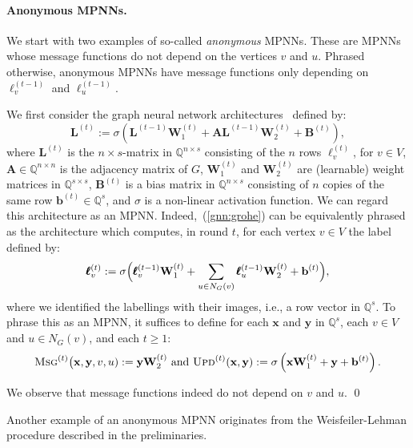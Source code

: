 \paragraph{Anonymous MPNNs.}
We start with two examples of so-called \textit{anonymous}  MPNNs. These are MPNNs whose message functions do not depend on the vertices $v$ and $u$. Phrased otherwise, anonymous MPNNs have message functions only depending on $\pmb{\ell}_v^{(t-1)}$ and $\pmb{\ell}_u^{(t-1)}$.


\begin{example}\label{ex:GNN}
We first consider
the graph neural network
architectures~\cite{hyl17,grohewl} defined by:
\begin{equation}
\mathbf{L}^{(t)}:=\sigma\left(\mathbf{L}^{(t-1)}\mathbf{W}_1^{(t)}+\mathbf{A}\mathbf{L}^{(t-1)}\mathbf{W}_2^{(t)}+\mathbf{B}^{(t)}\right), \label{gnn:grohe}
\end{equation}
where $\mathbf{L}^{(t)}$ is the $n\times s$-matrix in $\mathbb{Q}^{n\times s}$ consisting of the $n$ rows $\pmb{\ell}^{(t)}_v$, for $v\in V$, $\mathbf{A}\in\mathbb{Q}^{n\times n}$ is the adjacency matrix of $G$, $\mathbf{W}_1^{(t)}$ and $\mathbf{W}_2^{(t)}$ are (learnable) weight matrices in $\mathbb{Q}^{s\times s}$,
$\mathbf{B}^{(t)}$ is a bias matrix in $\mathbb{Q}^{n\times s}$ consisting of $n$ copies of the same row $\mathbf{b}^{(t)}\in \mathbb{Q}^s$, and $\sigma$ is a non-linear activation function. We can regard this architecture as an MPNN. Indeed,~(\ref{gnn:grohe}) can be equivalently phrased as the architecture which computes, in round $t$, for each vertex $v\in V$ the label defined by:
\[
\pmb{\ell}^{(t)}_v:=\sigma\Bigl(\pmb{\ell}^{(t-1)}_v\mathbf{W}_1^{(t)}+ \sum_{u\in N_G(v)}\pmb{\ell}^{(t-1)}_u\mathbf{W}_2^{(t)}+\mathbf{b}^{(t)} \Bigr),
\]
where we identified the labellings with their images, i.e., a row vector in $\mathbb{Q}^s$. 
To phrase this as an MPNN, it suffices to define for each $\mathbf{x}$ and $\mathbf{y}$ in $\mathbb{Q}^s$, each $v\in V$ and $u\in N_G(v)$, and each $t\geq 1$:
\begin{equation*}
	\textsc{Msg}^{(t)}\bigl(\mathbf{x},\mathbf{y},v,u):=\mathbf{y}\mathbf{W}_2^{(t)}
\text{ and } 
\textsc{Upd}^{(t)}(\mathbf{x},\mathbf{y}):=\sigma\left(\mathbf{x}\mathbf{W}_1^{(t)}+\mathbf{y} + \mathbf{b}^{(t)}\right).
\end{equation*} 

We observe that  message functions indeed do not depend on $v$ and $u$. \qed
\end{example}
Another example of an anonymous MPNN originates from the Weisfeiler-Lehman procedure described in the preliminaries.
